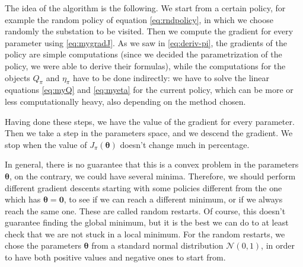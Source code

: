 The idea of the algorithm is the following. We start from a certain policy, for example the random policy of equation \eqref{eq:rndpolicy}, in which we choose randomly the substation to be visited. Then we compute the gradient for every parameter using \eqref{eq:mygradJ}. As we saw in \eqref{eq:deriv-pi}, the gradients of the policy are simple computations (since we decided the parametrization of the policy, we were able to derive their formulas), while the computations for the objects $Q_\pi$ and $\eta_\pi$ have to be done indirectly: we have to solve the linear equations \eqref{eq:myQ} and \eqref{eq:myeta} for the current policy, which can be more or less computationally heavy, also depending on the method chosen.

Having done these steps, we have the value of the gradient for every parameter. Then we take a step in the parameters space, and we descend the gradient. We stop when the value of $J_\pi (\boldsymbol \theta)$ doesn't change much in percentage.

In general, there is no guarantee that this is a convex problem in the parameters $\boldsymbol \theta$, on the contrary, we could have several minima. Therefore, we should perform different gradient descents starting with some policies different from the one which has $\boldsymbol \theta = \mathbf 0$, to see if we can reach a different minimum, or if we always reach the same one. These are called random restarts. Of course, this doesn't guarantee finding the global minimum, but it is the best we can do to at least check that we are not stuck in a local minimum. For the random restarts, we chose the parameters $\boldsymbol \theta$ from a standard normal distribution $\mathcal N(0,1)$, in order to have both positive values and negative ones to start from.

